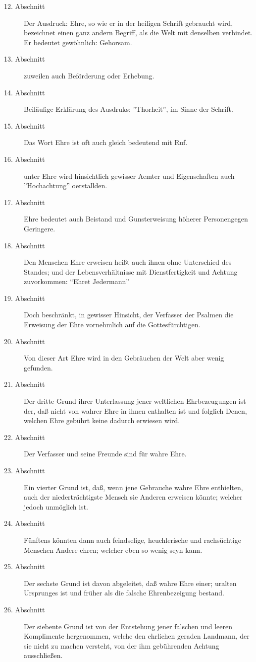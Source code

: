 \begin{description}
\item[12. Abschnitt] Der Ausdruck: Ehre, so wie er in der heiligen Schrift gebraucht wird, bezeichnet einen ganz andern Begriff, als die Welt mit denselben verbindet. Er bedeutet gewöhnlich: Gehorsam.
\item[13. Abschnitt] zuweilen auch Beförderung oder Erhebung.
\item[14. Abschnitt] Beiläufige Erklärung des Ausdruks: ''Thorheit'', im Sinne der Schrift.
\item[15. Abschnitt] Das Wort Ehre ist oft auch gleich bedeutend mit Ruf.
\item[16. Abschnitt] unter Ehre wird hinsichtlich gewisser Aemter und Eigenschaften auch ''Hochachtung'' oerstallden.
\item[17. Abschnitt] Ehre bedeutet auch Beistand und Gunsterweisung höherer Personengegen Geringere.
\item[18. Abschnitt]  Den Menschen Ehre erweisen heißt auch ihnen ohne Unterschied des Standes; und der Lebensverhältnisse mit Dienstfertigkeit und Achtung zuvorkommen: "`Ehret Jedermann"'
\item[19. Abschnitt] Doch beschränkt, in gewisser Hinsicht, der Verfasser der Psalmen die Erweisung der Ehre vornehmlich auf die Gottesfürchtigen.
\item[20. Abschnitt] Von dieser Art Ehre wird in den Gebräuchen der Welt aber wenig gefunden.
\item[21. Abschnitt] Der dritte Grund ihrer Unterlassung jener weltlichen Ehrbezeugungen ist der, daß nicht von wahrer Ehre in ihnen enthalten ist und folglich Denen, welchen Ehre gebührt keine dadurch erwiesen wird.
\item[22. Abschnitt] Der Verfasser und seine Freunde sind für wahre Ehre.
\item[23. Abschnitt] Ein vierter Grund ist, daß, wenn jene Gebrauche wahre Ehre enthielten, auch der niederträchtigste Mensch sie Anderen erweisen könnte; welcher jedoch unmöglich ist.
\item[24. Abschnitt] Fünftens könnten dann auch feindselige, heuchlerische und rachsüchtige Menschen Andere ehren; welcher eben so wenig seyn kann.
\item[25. Abschnitt] Der sechste Grund ist davon abgeleitet, daß wahre Ehre einer; uralten Ursprunges ist und früher als die falsche Ehrenbezeigung bestand.
\item[26. Abschnitt] Der siebente Grund ist von der Entstehung jener falschen und leeren Komplimente hergenommen, welche den ehrlichen geraden Landmann, der sie nicht zu machen versteht, von der ihm gebührenden Achtung ausschließen.

\end{description}
